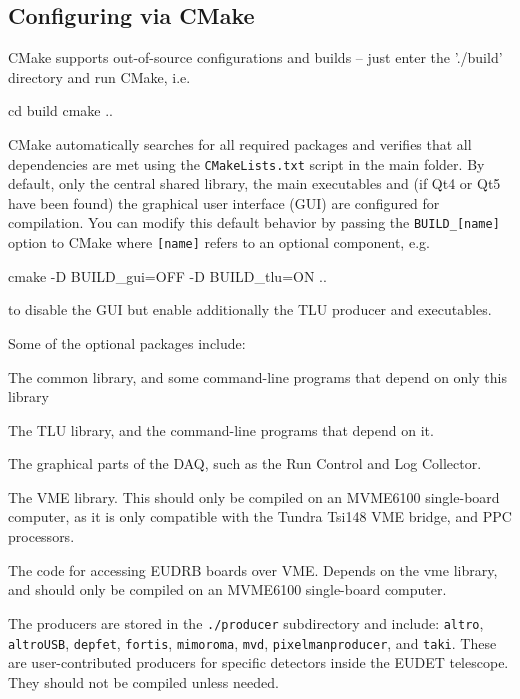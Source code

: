 \subsection{Configuring via CMake}
CMake supports out-of-source configurations and builds -- just enter
the './build' directory and run CMake, i.e.
\begin{listing}[mybash]
cd build
cmake ..
\end{listing}

CMake automatically searches for all required packages and verifies
that all dependencies are met using the \texttt{CMakeLists.txt} script in the
main folder. By default, only the central shared library, the main
executables and (if Qt4 or Qt5 have been found) the graphical user
interface (GUI) are configured for compilation. You can modify this
default behavior by passing the \texttt{BUILD\_[name]} option to
CMake where \texttt{[name]} refers to an optional component, e.g.
\begin{listing}[mybash]
cmake -D BUILD_gui=OFF -D BUILD_tlu=ON ..
\end{listing}
to disable the GUI but enable additionally the TLU producer and
executables.

Some of the optional packages include:
\begin{description}

The common library, and some command-line programs that depend on only this library

The TLU library, and the command-line programs that depend on it.

The graphical parts of the DAQ, such as the Run Control and Log Collector.

The VME library. This should only be compiled on an MVME6100 single-board computer,
as it is only compatible with the Tundra Tsi148 VME bridge, and PPC processors. 

The code for accessing EUDRB boards over VME.
Depends on the vme library, and should only be compiled on an MVME6100 single-board computer.

\end{description}

The producers are stored in the \texttt{./producer} subdirectory and
include: \texttt{altro}, \texttt{altroUSB}, \texttt{depfet},
\texttt{fortis}, \texttt{mimoroma}, \texttt{mvd},
\texttt{pixelmanproducer}, and \texttt{taki}. These are
user-contributed producers for specific detectors inside the EUDET
telescope.  They should not be compiled unless needed.


